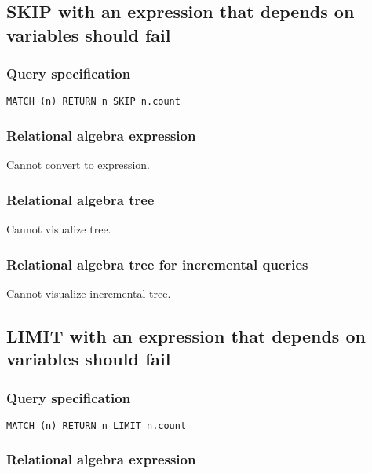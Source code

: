 \subsection{SKIP with an expression that depends on variables should fail}

\subsubsection*{Query specification}

\begin{lstlisting}
MATCH (n) RETURN n SKIP n.count
\end{lstlisting}

\subsubsection*{Relational algebra expression}

Cannot convert to expression.

\subsubsection*{Relational algebra tree}

Cannot visualize tree.

\subsubsection*{Relational algebra tree for incremental queries}

Cannot visualize incremental tree.

\subsection{LIMIT with an expression that depends on variables should fail}

\subsubsection*{Query specification}

\begin{lstlisting}
MATCH (n) RETURN n LIMIT n.count
\end{lstlisting}

\subsubsection*{Relational algebra expression}

